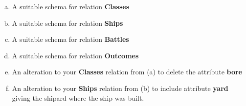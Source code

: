 \documentclass[12pt]{article}
\begin{document}
\begin{enumerate}[1.]
    \bigskip

    \begin{enumerate}[a)]
        \item A suitable schema for relation \textbf{Classes}
        \item A suitable schema for relation \textbf{Ships}
        \item A suitable schema for relation \textbf{Battles}
        \item A suitable schema for relation \textbf{Outcomes}
        \item An alteration to your \textbf{Classes} relation from (a) to delete
        the attribute \textbf{bore}
        \item An alteration to your \textbf{Ships} relation from (b) to include
        attribute \textbf{yard} giving the shipard where the ship was built.
    \end{enumerate}
\end{enumerate}
\end{document}
